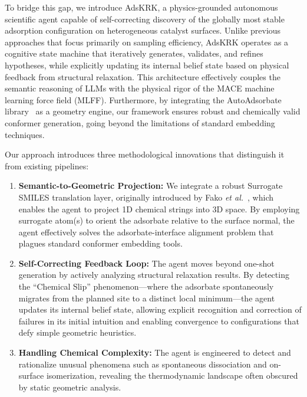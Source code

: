 \documentclass{article}
\begin{document}
To bridge this gap, we introduce AdsKRK, a physics-grounded autonomous scientific agent capable of self-correcting discovery of the globally most stable adsorption configuration on heterogeneous catalyst surfaces. Unlike previous approaches that focus primarily on sampling efficiency, AdsKRK operates as a cognitive state machine that iteratively generates, validates, and refines hypotheses, while explicitly updating its internal belief state based on physical feedback from structural relaxation. This architecture effectively couples the semantic reasoning of LLMs with the physical rigor of the MACE machine learning force field (MLFF). Furthermore, by integrating the AutoAdsorbate library~\cite{fako2025simple} as a geometry engine, our framework ensures robust and chemically valid conformer generation, going beyond the limitations of standard embedding techniques.

Our approach introduces three methodological innovations that distinguish it from existing pipelines:

\begin{enumerate}
    \item \textbf{Semantic-to-Geometric Projection:} We integrate a robust Surrogate SMILES translation layer, originally introduced by Fako \textit{et al.}~\cite{fako2025simple}, which enables the agent to project 1D chemical strings into 3D space. By employing surrogate atom(s) to orient the adsorbate relative to the surface normal, the agent effectively solves the adsorbate-interface alignment problem that plagues standard conformer embedding tools.
    \item \textbf{Self-Correcting Feedback Loop:} The agent moves beyond one-shot generation by actively analyzing structural relaxation results. By detecting the ``Chemical Slip'' phenomenon—where the adsorbate spontaneously migrates from the planned site to a distinct local minimum—the agent updates its internal belief state, allowing explicit recognition and correction of failures in its initial intuition and enabling convergence to configurations that defy simple geometric heuristics.
    \item \textbf{Handling Chemical Complexity:} The agent is engineered to detect and rationalize unusual phenomena such as spontaneous dissociation and on-surface isomerization, revealing the thermodynamic landscape often obscured by static geometric analysis.
\end{enumerate}
\end{document}
